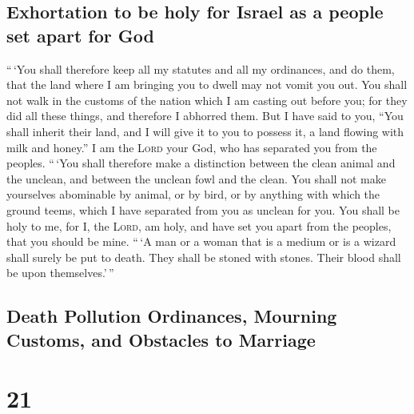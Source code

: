 \hypertarget{exhortation-to-be-holy-for-israel-as-a-people-set-apart-for-god}{%
\subsection{Exhortation to be holy for Israel as a people set apart for
God}\label{exhortation-to-be-holy-for-israel-as-a-people-set-apart-for-god}}

 ``\,`You shall therefore keep all my statutes and all my
ordinances, and do them, that the land where I am bringing you to dwell
may not vomit you out.  You shall not walk in the customs
of the nation which I am casting out before you; for they did all these
things, and therefore I abhorred them.  But I have said
to you, ``You shall inherit their land, and I will give it to you to
possess it, a land flowing with milk and honey.'' I am the \textsc{Lord}
your God, who has separated you from the peoples. 
``\,`You shall therefore make a distinction between the clean animal and
the unclean, and between the unclean fowl and the clean. You shall not
make yourselves abominable by animal, or by bird, or by anything with
which the ground teems, which I have separated from you as unclean for
you.  You shall be holy to me, for I, the \textsc{Lord},
am holy, and have set you apart from the peoples, that you should be
mine.  ``\,`A man or a woman that is a medium or is a
wizard shall surely be put to death. They shall be stoned with stones.
Their blood shall be upon themselves.'\,''

\hypertarget{death-pollution-ordinances-mourning-customs-and-obstacles-to-marriage}{%
\subsection{Death Pollution Ordinances, Mourning Customs, and Obstacles
to
Marriage}\label{death-pollution-ordinances-mourning-customs-and-obstacles-to-marriage}}

\hypertarget{section-20}{%
\section{21}\label{section-20}}

